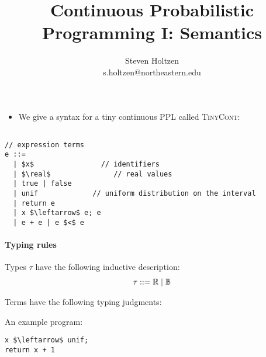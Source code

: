 \documentclass{tufte-handout}
\title{Continuous Probabilistic Programming I: Semantics}
\author[]{Steven Holtzen\\s.holtzen@northeastern.edu}
\begin{document}
\maketitle%


\begin{itemize}
  \item We give a syntax for a tiny continuous PPL called \textsc{TinyCont}:
\end{itemize}
\begin{lstlisting}[mathescape=true]

// expression terms
e ::=
  | $x$                // identifiers
  | $\real$               // real values
  | true | false
  | unif             // uniform distribution on the interval
  | return e
  | x $\leftarrow$ e; e
  | e + e | e $<$ e
\end{lstlisting}

\paragraph{Typing rules} Types $\tau$ have the following inductive description:
\begin{align*}
  \tau ::= \mathbb{R} \mid \mathbb{B}
\end{align*}

Terms have the following typing judgments:


An example program: 

\begin{lstlisting}[caption={Simple program.}, mathescape=true]
x $\leftarrow$ unif;
return x + 1
\end{lstlisting}


\end{document}
